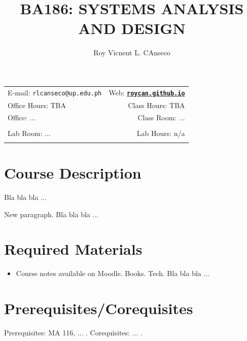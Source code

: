 \documentclass[11pt]{article}
\title{BA186: SYSTEMS ANALYSIS AND DESIGN}
\author{Roy Vicnent L. CAnseco}
\date{}
\newcommand{\blankline}{\quad\pagebreak[2]}
\begin{document}
\maketitle

\blankline

\begin{tabular*}{.93\textwidth}{@{\extracolsep{\fill}}lr}


E-mail: \texttt{rlcanseco@up.edu.ph} & Web: \href{roycan.github.io}{\tt\bf roycan.github.io}  \\

 Office Hours: TBA  &  Class Hours: TBA \\

 Office: ... & Class Room: ... \\
 & \\
Lab Room: ... & Lab Hours: n/a \\
&  \\
\hline
\end{tabular*}

\vspace{5 mm}


\section*{Course Description}

Bla bla bla ...

\bigskip

\noindent New paragraph. Bla bla bla ...


\section*{Required Materials}

\begin{itemize}
\item Course notes available on Moodle. Books. Tech. Bla bla bla ...
\end{itemize}


\section*{Prerequisites/Corequisites}
Prerequisites: MA 116, ... .  Corequisites: ... .
\end{document}
